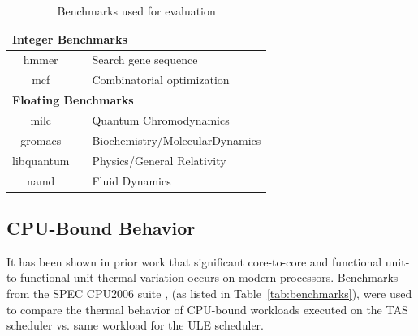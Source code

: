 \documentclass[times, 10pt,twocolumn]{IEEEtran}
\begin{document}
\begin{table}[tpbh]
  \caption{Benchmarks used for evaluation}
  \label{tab:benchmarks} 
\centering
\begin{tabular}{c c p{5cm}} 
\hline 
\hline
\multicolumn{3}{l}{\textbf{Integer Benchmarks}}\\ 
\hline 
hmmer &  & Search gene sequence \\
mcf &  & Combinatorial optimization \\
\hline 
\hline
\multicolumn{3}{l}{\textbf{Floating Benchmarks}}\\ 
\hline 
milc &  & Quantum Chromodynamics \\
gromacs &  & Biochemistry/MolecularDynamics \\
libquantum &  & Physics/General Relativity \\
namd &  & Fluid Dynamics \\
\hline
\end{tabular} %

\end{table}
\subsection{CPU-Bound Behavior}
\label{sec:microarch} It has been shown in prior work
\cite{Choi2007,Cher2011} that significant core-to-core and functional
unit-to-functional unit thermal variation occurs on modern processors.
Benchmarks from the SPEC CPU2006 suite \cite{Spec2006}, (as listed in
Table~\eqref{tab:benchmarks}), were used to compare the thermal behavior
of CPU-bound workloads executed on the TAS scheduler vs. same workload
for the ULE scheduler.
\end{document}
